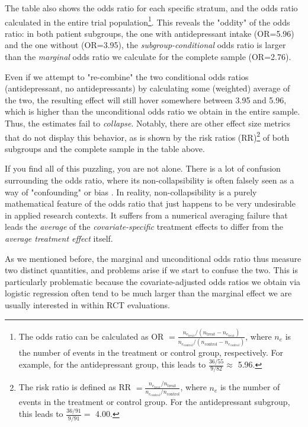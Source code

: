 The table also shows the odds ratio for each specific stratum, and the odds ratio calculated in the entire trial population\footnote{The odds ratio can be calculated as OR $= \frac{n_{e_{\text{treat}}}/(n_{\text{treat}}-n_{e_{\text{treat}}})}{n_{e_{\text{control}}}/(n_{\text{control}}-n_{e_{\text{control}}})}$, where $n_e$ is the number of events in the treatment or control group, respectively. For example, for the antidepressant group, this leads to $\frac{\text{36/55}}{\text{9/82}} \approx$ 5.96.}. This reveals the "oddity" of the odds ratio: in both patient subgroups, the one with antidepressant intake (OR=5.96) and the one without (OR=3.95), the \emph{subgroup-conditional} odds ratio is larger than the \emph{marginal} odds ratio we calculate for the complete sample (OR=2.76).

Even if we attempt to "re-combine" the two conditional odds ratios (antidepressant, no antidepressants) by calculating some (weighted) average of the two, the resulting effect will still hover somewhere between 3.95 and 5.96, which is higher than the unconditional odds ratio we obtain in the entire sample. Thus, the estimates fail to \emph{collapse}. Notably, there are other effect size metrics that do not display this behavior, as is shown by the risk ratios (RR)\footnote{The risk ratio is defined as RR $= \frac{n_{e_{\text{treat}}}/n_{\text{treat}}}{n_{e_{\text{control}}}/n_{\text{control}}}$, where $n_e$ is the number of events in the treatment or control group. For the antidepressant subgroup, this leads to $\frac{\text{36/91}}{\text{9/91}} =$ 4.00.} of both subgroups and the complete sample in the table above. 

If you find all of this puzzling, you are not alone. There is a lot of confusion surrounding the odds ratio, where its non-collapsibility is often falsely seen as a way of "confounding" or bias \citep{greenland2021noncollapsibility, greenland1999confounding}. In reality, non-collapsibility is a purely mathematical feature of the odds ratio that just happens to be very undesirable in applied research contexts. It suffers from a numerical averaging failure that leads the \emph{average} of the \emph{covariate-specific} treatment effects to differ from the \emph{average treatment effect} itself. 

As we mentioned before, the marginal and unconditional odds ratio thus measure two distinct quantities, and problems arise if we start to confuse the two. This is particularly problematic because the covariate-adjusted odds ratios we obtain via logistic regression often tend to be much larger than the marginal effect we are usually interested in within RCT evaluations. 

